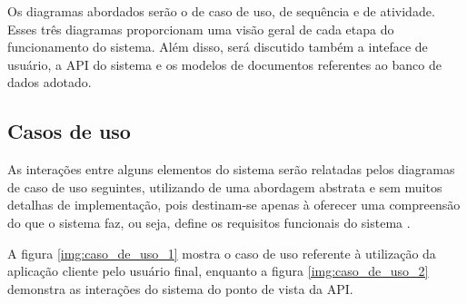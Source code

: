 Os diagramas abordados serão o de caso de uso, de sequência e de atividade. Esses três diagramas proporcionam uma visão geral de cada etapa do funcionamento do sistema. Além disso, será discutido também a inteface de usuário, a API do sistema e os modelos de documentos referentes ao banco de dados adotado.

\subsection{Casos de uso} \label{subsec:casosDeUso}

As interações entre alguns elementos do sistema serão relatadas pelos diagramas de caso de uso seguintes, utilizando de uma abordagem abstrata e sem muitos detalhas de implementação, pois destinam-se apenas à oferecer uma compreensão do que o sistema faz, ou seja, define os requisitos funcionais do sistema \cite{sommerville2011engenharia}.

A figura \ref{img:caso_de_uso_1} mostra o caso de uso referente à utilização da aplicação cliente pelo usuário final, enquanto a figura \ref{img:caso_de_uso_2} demonstra as interações do sistema do ponto de vista da API.


